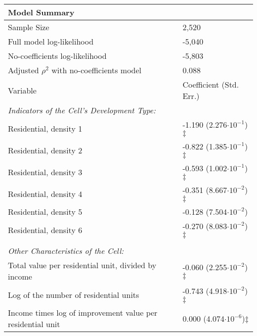 
\begin{tabular}{p{4.25in}l}
\toprule
    Model Summary & \\
\midrule
    Sample Size & 2,520\\
    Full model log-likelihood & -5,040 \\
    No-coefficients log-likelihood & -5,803 \\
    Adjusted $\rho^2$ with no-coefficients model & 0.088 \\
\midrule
    Variable & Coefficient (Std. Err.)\\
\midrule
\multicolumn{2}{l}{\emph{Indicators of the Cell's Development Type:}} \\
Residential, density 1                                                                          &         -1.190 (2.276$\cdot 10^{-1}$)$\ddagger$   \\
Residential, density 2                                                                          &         -0.822 (1.385$\cdot 10^{-1}$)$\ddagger$   \\
Residential, density 3                                                                          &         -0.593 (1.002$\cdot 10^{-1}$)$\ddagger$   \\
Residential, density 4                                                                          &         -0.351 (8.667$\cdot 10^{-2}$)$\ddagger$   \\
Residential, density 5                                                                          &         -0.128 (7.504$\cdot 10^{-2}$)             \\
Residential, density 6                                                                          &         -0.270 (8.083$\cdot 10^{-2}$)$\ddagger$   \\
\\ \multicolumn{2}{l}{\emph{Other Characteristics of the Cell:}} \\
Total value per residential unit, divided by income                                             &         -0.060 (2.255$\cdot 10^{-2}$)$\ddagger$   \\
Log of the number of residential units                                                          &         -0.743 (4.918$\cdot 10^{-2}$)$\ddagger$   \\
Income times log of improvement value per residential unit                                      &          0.000 (4.074$\cdot 10^{-6}$)$\ddagger$   \\

\end{tabular}
